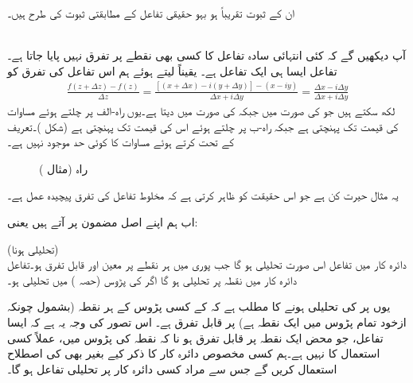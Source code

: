 ان کے ثبوت تقریباً ہو بہو حقیقی تفاعل کے مطابقتی ثبوت کی طرح ہیں۔

\quad {}\\
آپ دیکھیں گے کہ کئی انتہائی سادہ تفاعل کا کسی بھی نقطے پر تفرق نہیں پایا جاتا ہے۔تفاعل  ایسا ہی ایک تفاعل ہے۔ یقیناً  لیتے ہوئے ہم اس تفاعل کی تفرق کو
\begin{align}\label{مساوات_مخلوط_نا_قابل_تفرق}
\frac{f(z+\Delta z)-f(z)}{\Delta z}=\frac{[(x+\Delta x)-i(y+\Delta y)]-(x-iy)}{\Delta x+i\Delta y}=\frac{\Delta x-i\Delta y}{\Delta x+i\Delta y}
\end{align}
لکھ سکتے ہیں جو  کی صورت میں  جبکہ  کی صورت میں  دیتا ہے۔یوں  راہ-الف پر چلتے ہوئے مساوات  کی قیمت  تک پہنچتی ہے جبکہ راہ-ب پر چلتے ہوئے اس کی قیمت  تک پہنچتی ہے (شکل )۔تعریف کے تحت  کرتے ہوئے  مساوات  کا کوئی حد موجود نہیں ہے۔
\begin{figure}
\centering
{}
\caption{راہ (مثال )}
\label{شکل_مثال_مخلوط_نا_قابل_تفرق}
\end{figure}
یہ مثال حیرت کن ہے جو اس حقیقت کو ظاہر کرتی ہے کہ مخلوط تفاعل کی تفرق پیچیدہ عمل ہے۔

اب ہم اپنے اصل مضمون پر آتے ہیں یعنی:

\quad (تحلیلی ہونا)\\
دائرہ کار  میں تفاعل  اس صورت تحلیلی ہو گا جب پوری  میں ہر نقطے پر  معین اور قابل تفرق ہو۔تفاعل  دائرہ کار  میں نقطہ  پر تحلیلی ہو گا اگر  کی پڑوس (حصہ ) میں  تحلیلی ہو۔

یوں  پر  کی تحلیلی ہونے کا مطلب ہے کہ  کے کسی پڑوس کے ہر نقطہ (بشمول  چونکہ  ازخود تمام پڑوس میں ایک نقطہ ہے) پر  قابل تفرق ہے۔ اس تصور کی وجہ یہ ہے کہ ایسا تفاعل، جو محض  ایک نقطہ پر قابل تفرق ہو نا کہ نقطہ کی پڑوس میں، عملاً  کسی استعمال کا نہیں ہے۔ہم کسی مخصوص دائرہ کار کا ذکر کیے بغیر  بھی  کی اصطلاح استعمال کریں گے جس سے مراد کسی دائرہ کار پر تحلیلی تفاعل ہو گا۔

